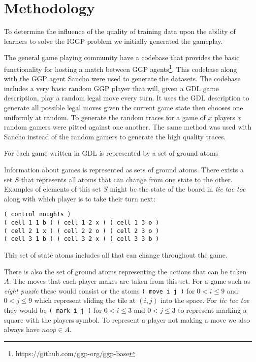 \chapter{Methodology}
To determine the influence of the quality of training data upon the ability of learners to solve the IGGP problem we initially generated the gameplay.

The general game playing community have a codebase that provides the basic functionality for hosting a match between GGP agents\footnote{https://github.com/ggp-org/ggp-base}. This codebase along with the GGP agent Sancho were used to generate the datasets. The codebase includes a very basic random GGP player that will, given a GDL game description, play a random legal move every turn. It uses the GDL description to generate all possible legal moves given the current game state then chooses one uniformly at random. To generate the random traces for a game of $x$ players $x$ random gamers were pitted against one another. The same method was used with Sancho instead of the random gamers to generate the high quality traces.

For each game written in GDL is represented by a set of ground atoms 

Information about games is represented as sets of ground atoms. There exists a set $S$ that represents all atoms that can change from one state to the other. Examples of elements of this set $S$ might be the state of the board in \textit{tic tac toe} along with which player is to take their turn next:
\begin{verbatim}
( control noughts )
( cell 1 1 b ) ( cell 1 2 x ) ( cell 1 3 o )  
( cell 2 1 x ) ( cell 2 2 o ) ( cell 2 3 o )
( cell 3 1 b ) ( cell 3 2 x ) ( cell 3 3 b )
\end{verbatim}
This set of state atoms includes all that can change throughout the game. 

There is also the set of ground atoms representing the actions that can be taken $A$. The moves that each player makes are taken from this set. For a game such as \textit{eight puzzle} these would consist or the atoms \verb|( move i j )| for $0<i\leq 9$ and $0<j\leq 9$ which represent sliding the tile at $(i,j)$ into the space. For \textit{tic tac toe} they would be \verb|( mark i j )| for $0<i\leq 3$ and $0<j\leq 3$ to represent marking a square with the players symbol. To represent a player not making a move we also always have $noop \in A$.
 
